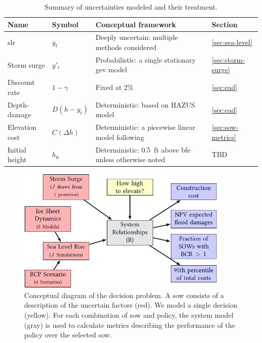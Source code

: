 \documentclass[12pt]{article}
\begin{document}
\begin{table}
    \centering
    \caption{Summary of uncertainties modeled and their treatment.}\label{tab:uncertainties}
    \begin{tabular}{l l p{3in} l}
        \toprule
        Name           & Symbol           & Conceptual framework                                                                 & Section               \\
        \midrule
        \Gls{slr}      & $\overline{y}_t$ & Deeply uncertain: multiple methods considered                                        & \ref{sec:sea-level}   \\
        Storm surge    & $y'_t$           & Probabilistic: a single stationary \acrshort{gev} model                              & \ref{sec:storm-surge} \\
        Discount rate  & $1-\gamma$       & Fixed at 2\%                                                                         & \ref{sec:ead}         \\
        Depth-damage   & $D(h-y_t)$       & Deterministic: based on HAZUS model                                                  & \ref{sec:ead}         \\
        Elevation cost & $C(\Delta h)$    & Deterministic: a piecewise linear model following \citet{zarekarizi_suboptimal:2020} & \ref{sec:sow-metrics} \\
        Initial height & $h_0$            & Deterministic: \SI{0.5}{ft} above \gls{bfe} unless otherwise noted                   & TBD                   \\
        \bottomrule
    \end{tabular}
\end{table}

\begin{figure}
    \centering
    \includegraphics[width=4in]{xlrm.pdf}
    \caption{
        Conceptual diagram of the decision problem.
        A \gls{sow} consists of a description of the uncertain factors (red).
        We model a single decision (yellow).
        For each combination of \gls{sow} and policy, the system model (gray) is used to calculate metrics describing the performance of the policy over the selected \gls{sow}.
    }\label{fig:xlrm}
\end{figure}
\end{document}
